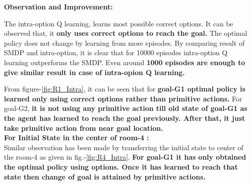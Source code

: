 \documentclass[preprint,12pt]{elsarticle}
\begin{document}
\textbf{Observation and Improvement:}


The intra-option Q learning, learns most possible correct options. It can be observed that, it \textbf{only uses correct options to reach the goal.} The optimal policy does not change by learning from more episodes. By comparing result of SMDP and intra-option, it is clear that for 10000 episodes intra-option Q learning outperforms the SMDP. Even around \textbf{1000 episodes are enough to give similar result in case of intra-opion Q learning. }

From figure-\ref{fig:R1_Intra}, it can be seen that for \textbf{goal-G1 optimal policy is learned only using correct options rather than primitive actions.} For goal-G2, \textbf{it is not using any primitive action till old state of goal-G1 as the agent has learned to reach the goal previously. After that, it just take primitive action from near goal location.} \\


\textbf{For Initial State in the center of room-4 :} \\

 Similar observation has been made by transferring the initial state to center of the room-4 as given in fig.-\ref{fig:R4_Intra}. \textbf{For goal-G1 it has only obtained the optimal policy using options. Once it has learned to reach that state then change of goal is attained by primitive actions.} \\
 
\end{document}
